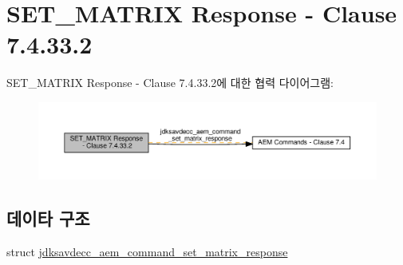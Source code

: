 \hypertarget{group__command__set__matrix__response}{}\section{S\+E\+T\+\_\+\+M\+A\+T\+R\+IX Response -\/ Clause 7.4.33.2}
\label{group__command__set__matrix__response}
S\+E\+T\+\_\+\+M\+A\+T\+R\+IX Response -\/ Clause 7.4.33.2에 대한 협력 다이어그램\+:
\nopagebreak
\begin{figure}[H]
\begin{center}
\leavevmode
\includegraphics[width=350pt]{group__command__set__matrix__response}
\end{center}
\end{figure}
\subsection*{데이타 구조}
\begin{DoxyCompactItemize}
\item 
struct \hyperlink{structjdksavdecc__aem__command__set__matrix__response}{jdksavdecc\+\_\+aem\+\_\+command\+\_\+set\+\_\+matrix\+\_\+response}
\end{DoxyCompactItemize}
